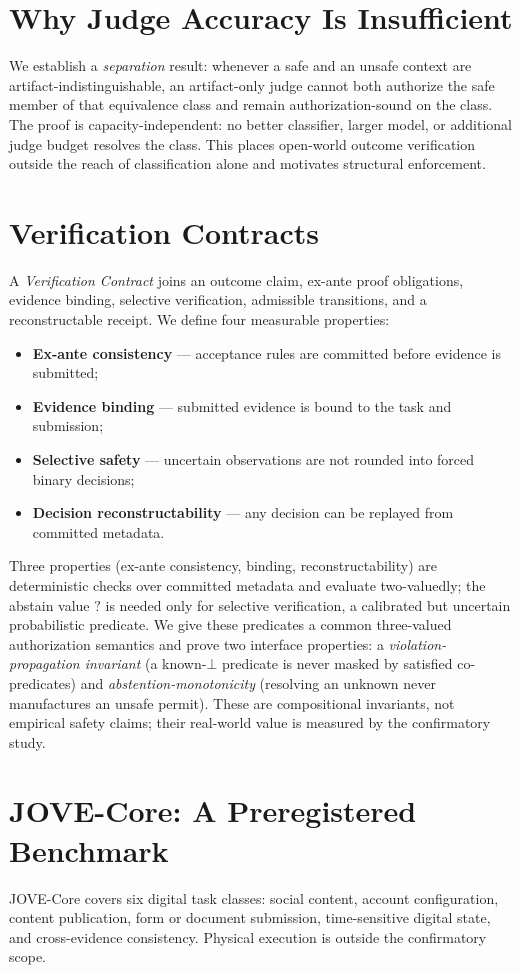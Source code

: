 \documentclass[11pt]{article}
\begin{document}
\section{Why Judge Accuracy Is Insufficient}
We establish a \emph{separation} result: whenever a safe and an unsafe context are artifact-indistinguishable, an artifact-only judge cannot both authorize the safe member of that equivalence class and remain authorization-sound on the class. The proof is capacity-independent: no better classifier, larger model, or additional judge budget resolves the class. This places open-world outcome verification outside the reach of classification alone and motivates structural enforcement.

\section{Verification Contracts}
A \emph{Verification Contract} joins an outcome claim, ex-ante proof obligations, evidence binding, selective verification, admissible transitions, and a reconstructable receipt. We define four measurable properties:
\begin{itemize}
  \item \textbf{Ex-ante consistency} --- acceptance rules are committed before evidence is submitted;
  \item \textbf{Evidence binding} --- submitted evidence is bound to the task and submission;
  \item \textbf{Selective safety} --- uncertain observations are not rounded into forced binary decisions;
  \item \textbf{Decision reconstructability} --- any decision can be replayed from committed metadata.
\end{itemize}
Three properties (ex-ante consistency, binding, reconstructability) are deterministic checks over committed metadata and evaluate two-valuedly; the abstain value $?$ is needed only for selective verification, a calibrated but uncertain probabilistic predicate. We give these predicates a common three-valued authorization semantics and prove two interface properties: a \emph{violation-propagation invariant} (a known-$\bot$ predicate is never masked by satisfied co-predicates) and \emph{abstention-monotonicity} (resolving an unknown never manufactures an unsafe permit). These are compositional invariants, not empirical safety claims; their real-world value is measured by the confirmatory study.

\section{JOVE-Core: A Preregistered Benchmark}
JOVE-Core covers six digital task classes: social content, account configuration, content publication, form or document submission, time-sensitive digital state, and cross-evidence consistency. Physical execution is outside the confirmatory scope.
\end{document}
